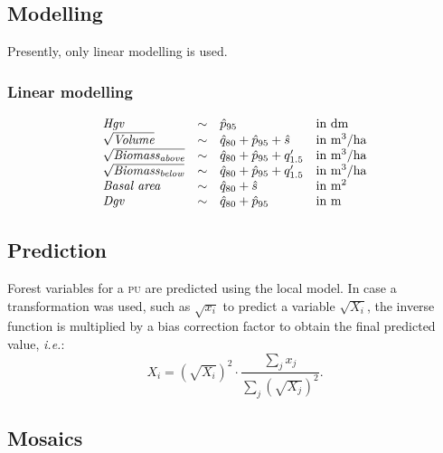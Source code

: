 \documentclass[english,a4paper,minion,nofigsidecaption]{article}
\providecommand{\ie}{\textit{i.e.}}
\providecommand{\abbr}[1]{\texorpdfstring{\textsc{\MakeLowercase{#1}}}{#1}}
\newcommand{\slu}{\abbr{SLU}}
\newcommand{\pu}{\abbr{PU}}
\newcommand{\first}[1]{\ensuremath{\hat{#1}}}
\newcommand{\perc}[1]{\ensuremath{\first{p}_{#1}}}
\newcommand{\stdf}{\ensuremath{\first{s}}}
\newcommand{\hveg}[1]{\ensuremath{\first{q}_{#1}}}
\newcommand{\prop}[1]{\ensuremath{q'_{#1}}}
\newcommand{\sis}{\abbr{SIS}}%
\newcommand{\wet}{\ensuremath{w_\textrm{\slu}}}%
\begin{document}
\subsection{Modelling}

Presently, only linear modelling is used. 


\subsubsection{Linear modelling}

$$
	\begin{array}{l@{\quad\sim\quad}l@{\quad}l}
		\textit{Hgv}							& 				\perc{95}				& \textrm{in dm}				\\
		\sqrt{\textit{Volume}}					& \hveg{80} +	\perc{95} +	\stdf		& \textrm{in m}^3/\textrm{ha}	\\
		\sqrt{\textit{Biomass}_\textit{above}}	& \hveg{80} +	\perc{95} +	\prop{1.5}	& \textrm{in m}^3/\textrm{ha}	\\
		\sqrt{\textit{Biomass}_\textit{below}}	& \hveg{80} +	\perc{95} +	\prop{1.5}	& \textrm{in m}^3/\textrm{ha}	\\
		\textit{Basal area}						& \hveg{80} +				\stdf		& \textrm{in m}^2				\\
		\textit{Dgv}							& \hveg{80}	+	\perc{95} 				& \textrm{in m}					\\
	\end{array}
$$



\subsection{Prediction}

Forest variables for a {\pu} are predicted using the local model. In case a transformation was used, such as $\sqrt{x_i}$ to predict a variable $\sqrt{X_i}$, the inverse function is multiplied by a bias correction factor to obtain the final predicted value, \ie:
$$
	X_i = \left(\sqrt{X_i}\right)^2 \cdot \frac{\sum_j x_j}{\sum_j \left(\sqrt{X_j}\right)^2}.
$$



\subsection{Mosaics}
\end{document}
